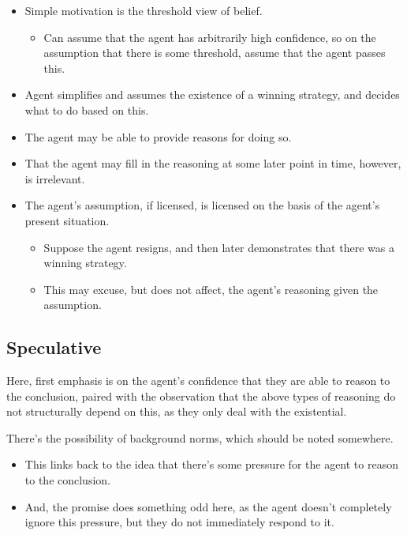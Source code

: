 \documentclass[10pt]{article}
\begin{document}
\begin{itemize}
\item Simple motivation is the threshold view of belief.
  \begin{itemize}
  \item Can assume that the agent has arbitrarily high confidence, so on the assumption that there is some threshold, assume that the agent passes this.
  \end{itemize}
\item Agent simplifies and assumes the existence of a winning strategy, and decides what to do based on this.
\item The agent may be able to provide reasons for doing so.
\item That the agent may fill in the reasoning at some later point in time, however, is irrelevant.
\item The agent's assumption, if licensed, is licensed on the basis of the agent's present situation.
  \begin{itemize}
  \item Suppose the agent resigns, and then later demonstrates that there was a winning strategy.
  \item This may excuse, but does not affect, the agent's reasoning given the assumption.
  \end{itemize}
\end{itemize}

\subsection{Speculative}
\label{sec:speculative}

\begin{note}
  Here, first emphasis is on the agent's confidence that they are able to reason to the conclusion, paired with the observation that the above types of reasoning do not structurally depend on this, as they only deal with the existential.
\end{note}

\begin{note}
  There's the possibility of background norms, which should be noted somewhere.
  \begin{itemize}
  \item This links back to the idea that there's some pressure for the agent to reason to the conclusion.
  \item And, the promise does something odd here, as the agent doesn't completely ignore this pressure, but they do not immediately respond to it.
  \end{itemize}
\end{note}
\end{document}
